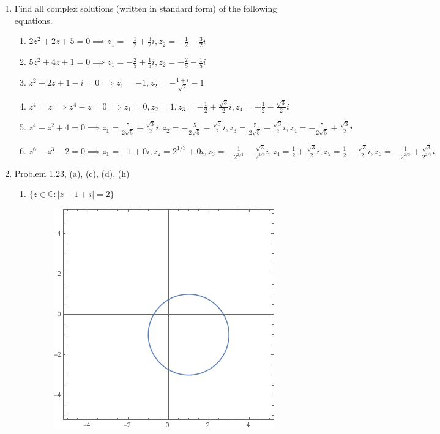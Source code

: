 \documentclass{article}
\begin{document}
\begin{enumerate}
	\item Find all complex solutions (written in standard form) of the following equations.
	\begin{enumerate}
		\item $2z^2 + 2z + 5 = 0 \implies z_1 = -\frac{1}{2} + \frac{3}{2}i, z_2 = -\frac{1}{2} - \frac{3}{2}i $
		\item $5z^2 + 4z +1 = 0 \implies z_1 = -\frac{2}{5} + \frac{1}{5}i, z_2 = -\frac{2}{5} - \frac{1}{5}i $
		\item $z^2 + 2z + 1 - i = 0 \implies z_1 =  - 1, z_2 = -\frac{1+i}{\sqrt{2}} - 1$
		\item $z^4 = z \implies z^4 - z = 0 \implies z_1 = 0, z_2 = 1, z_3 = -\frac{1}{2}+\frac{\sqrt{3}}{2}i, z_4 = -\frac{1}{2}-\frac{\sqrt{3}}{2}i$
		\item $z^4-z^2+4=0 \implies z_1 = \frac{5}{2\sqrt{5}} + \frac{\sqrt{3}}{2}i, z_2 = -\frac{5}{2\sqrt{5}} - \frac{\sqrt{3}}{2}i, z_3 = \frac{5}{2\sqrt{5}} - \frac{\sqrt{3}}{2}i, z_4 = -\frac{5}{2\sqrt{5}} + \frac{\sqrt{3}}{2}i  $
		\item $z^6 - z^3 - 2 = 0 \implies z_1=-1+0i,z_2=2^{1/3} + 0i, z_3=-\frac{1}{2^{2/3}}-\frac{\sqrt{3}}{2^{2/3}}i, z_4=\frac{1}{2}+\frac{\sqrt{3}}{2}i, z_5 = \frac{1}{2}-\frac{\sqrt{3}}{2}i, z_6=-\frac{1}{2^{2/3}}+\frac{\sqrt{3}}{2^{2/3}}i$
	\end{enumerate}
	
	
	\item Problem 1.23, (a), (c), (d), (h)
	
	\begin{enumerate}
		\item $\{z \in \mathbb{C} : |z - 1 + i| = 2\}$
			\begin{figure}[H]
			\includegraphics[scale=0.6]{123a.png}
			\end{figure}
			

\end{enumerate}
\end{enumerate}
\end{document}
